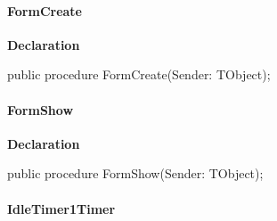 \documentclass{report}
\newif\ifpdf
\begin{document}
\paragraph*{FormCreate}\hspace*{\fill}

\label{editor.TFrmEditor-FormCreate}
\begin{list}{}{
\setlength{\itemindent}{0cm}
\setlength{\listparindent}{0cm}
\setlength{\leftmargin}{\evensidemargin}
\addtolength{\leftmargin}{\tmplength}
\settowidth{\labelsep}{X}
\addtolength{\leftmargin}{\labelsep}
\setlength{\labelwidth}{\tmplength}
}
\item[\textbf{Declaration}\hfill]
\ifpdf
\begin{flushleft}
\fi
\begin{ttfamily}
public procedure FormCreate(Sender: TObject);\end{ttfamily}

\ifpdf
\end{flushleft}
\fi

\end{list}
\paragraph*{FormShow}\hspace*{\fill}

\label{editor.TFrmEditor-FormShow}
\begin{list}{}{
\setlength{\itemindent}{0cm}
\setlength{\listparindent}{0cm}
\setlength{\leftmargin}{\evensidemargin}
\addtolength{\leftmargin}{\tmplength}
\settowidth{\labelsep}{X}
\addtolength{\leftmargin}{\labelsep}
\setlength{\labelwidth}{\tmplength}
}
\item[\textbf{Declaration}\hfill]
\ifpdf
\begin{flushleft}
\fi
\begin{ttfamily}
public procedure FormShow(Sender: TObject);\end{ttfamily}

\ifpdf
\end{flushleft}
\fi

\end{list}
\paragraph*{IdleTimer1Timer}\hspace*{\fill}
\end{document}

